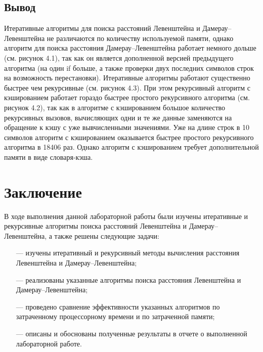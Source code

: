 \documentclass[a4paper,14pt, unknownkeysallowed]{extreport}
\begin{document}
\clearpage

\section*{Вывод}

Итеративные алгоритмы для поиска расстояний Левенштейна и Дамерау--Левенштейна не различаются по количеству используемой памяти, однако алгоритм для поиска расстояния Дамерау--Левенштейна работает немного дольше (см. рисунок 4.1), так как он является дополненной версией предыдущего алгоритма (на один if больше, а также проверки двух последних символов строк на возможность перестановки).
Итеративные алгоритмы работают существенно быстрее чем рекурсивные (см. рисунок 4.3). При этом рекурсивный алгоритм с кэшированием работает гораздо быстрее простого рекурсивного алгоритма (см. рисунок 4.2), так как в алгоритме с кэшированием большое количество рекурсивных вызовов, вычисляющих одни и те же данные заменяются на обращение к кэшу с уже вывчисленными значениями. Уже на длине строк в 10 символов алгоритм с кэшированием оказывается быстрее простого рекурсивного алгоритма в 18406 раз. Однако алгоритм с кэшированием требует дополнительной памяти в виде словаря-кэша.


\chapter*{Заключение}

В ходе выполнения данной лабораторной работы были изучены итеративные и рекурсивные алгоритмы поиска расстояний Левенштейна и Дамерау--Левенштейна, а также решены следующие задачи:
\begin{itemize}
	\item[---] изучены итеративный и рекурсивный методы вычисления расстояния Левенштейна и Дамерау--Левенштейна;
	\item[---] реализованы указанные алгоритмы поиска расстояния Левенштейна и Дамерау--Левенштейна;
	\item[---] проведено сравнение эффективности указанных алгоритмов по затраченному процессорному времени и по затраченной памяти;
	\item[---] описаны и обоснованы полученные результаты в отчете о выполненной лабораторной работе.
\end{itemize}
\end{document}
